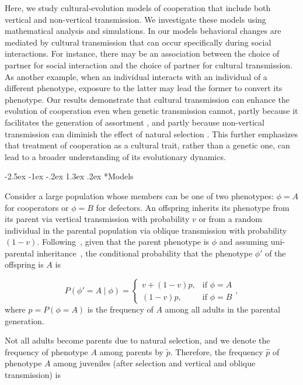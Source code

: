 \documentclass[12pt]{extarticle}
\makeatletter
\renewcommand\section{\@startsection {section}{1}{\z@}%
     {-2.5ex \@plus -1ex \@minus -.2ex}%
     {1.3ex \@plus.2ex}%
    {\Large\bfseries}}
\makeatother
\begin{document}
Here, we study cultural-evolution models of cooperation that include both vertical and non-vertical transmission. 
We investigate these models using mathematical analysis and simulations.  
In our models behavioral changes are mediated by cultural transmission that can occur specifically during social interactions.
For instance, there may be an association between the choice of partner for social interaction and the choice of partner for cultural transmission.
As another example, when an individual interacts with an individual of a different phenotype,  exposure to the latter may lead the former to  convert its phenotype.
Our results demonstrate that cultural transmission can enhance the evolution of cooperation even when genetic transmission cannot, partly because it facilitates the generation of assortment \citep{Fletcher2009assortment}, and partly because non-vertical transmission can diminish the effect of natural selection \citep{ram2018evolution}.
This further emphasizes that treatment of cooperation as a cultural trait, rather than a genetic one, can lead to a broader understanding of its evolutionary dynamics.


\section*{Models}

Consider a large population whose members can be one of two phenotypes: $\phi=A$ for cooperators or $\phi=B$ for defectors.
An offspring inherits its phenotype from its parent via vertical transmission with probability $v$ or from a random individual in the parental population via oblique transmission with probability $(1-v)$. 
Following~\citet{ram2018evolution}, given that the parent phenotype is $\phi$ and assuming uni-parental inheritance~\citep{Zefferman2016}, the conditional probability that the phenotype $\phi'$ of the offspring is $A$ is 

\begin{equation} \label{eq:vertical_oblique_transmission}
P(\phi'=A \mid \phi) = \begin{cases}
v + (1-v)p, & \text{if } \phi=A \\
(1-v)p, & \text{if } \phi=B
\end{cases},
\end{equation}
where $p=P(\phi=A)$ is the frequency of $A$ among all adults in the parental generation.  

Not all adults become parents due to natural selection, and we denote the frequency of phenotype $A$ among parents by $\tilde{p}$.
Therefore, the frequency $\hat{p}$ of  phenotype $A$ among juveniles (after selection and vertical and oblique transmission) is
\end{document}
